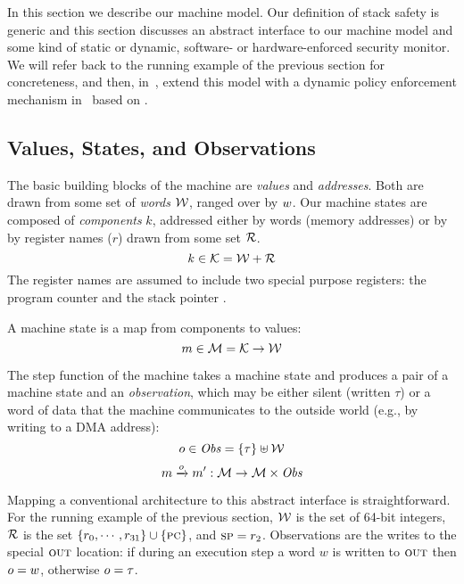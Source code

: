 \documentclass[acmsmall,review,anonymous]{acmart}\settopmatter{printfolios=true,printccs=false,printacmref=false}
\begin{document}
In this section we describe our machine model. Our definition of stack
safety is generic and this section discusses an abstract interface to
our machine model and some kind of static or dynamic, software- or
hardware-enforced security monitor. We will refer back to the running
example of the previous section for concreteness, and then,
in~, extend this model with a dynamic policy
enforcement mechanism in~ based on
.

\subsection{Values, States, and Observations}

The basic building blocks of the machine are {\em values} and {\em
  addresses}. Both are drawn from some set of {\em words}
${\mathcal W}$, ranged over by $w$.
%
Our machine states are composed of {\em components} $k$, addressed either by
words (memory addresses) or by by register names ($r$) drawn from some set
${\mathcal R}$.
%
    \[k \in {\mathcal K} = {\mathcal W} + {\mathcal R} \]
%
The register names are assumed to include two special purpose registers: the
program counter {\PCname} and the stack pointer \SP.

A machine state is a map from components to values:
%
\[m \in {\mathcal M} = {\mathcal K} \rightarrow {\mathcal W}\]

The step function of the machine takes a machine state and produces a
pair of a machine state and an {\em observation}, which may be either
silent (written $\tau$) or a word of data that the machine
communicates to the outside world (e.g., by writing to a DMA
address):
%
\[o \in \mathit{Obs} = \{\tau\} \uplus {\mathcal W}\]
\[m \xrightarrow{o} m' : {\mathcal M} \rightarrow {\mathcal M} \times \mathit{Obs} \]
%

Mapping a conventional architecture to this abstract interface is
straightforward. For the running example of the previous section,
${\mathcal W}$ is the set of 64-bit integers, ${\mathcal R}$ is the set $\{r_0,
\cdots, r_{31}\} \cup \{\textsc{pc}\}$, and $\textsc{sp} = r_2$. Observations are
the writes to the special $\textsc{out}$ location: if during an execution
step a word $w$ is written to $\textsc{out}$ then $o = w$, otherwise $o
= \tau$.

\end{document}

